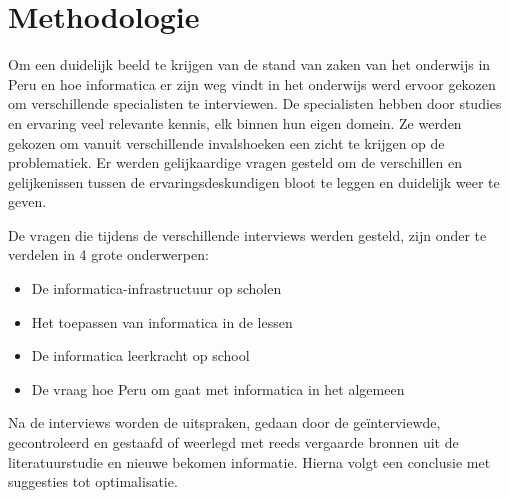 
\chapter{Methodologie}
\label{ch:methodologie}


Om een duidelijk beeld te krijgen van de stand van zaken van het onderwijs in Peru en hoe informatica er zijn weg vindt in het onderwijs werd ervoor gekozen om verschillende specialisten te interviewen. De specialisten hebben door studies en ervaring veel relevante kennis, elk binnen hun eigen domein. Ze werden gekozen om vanuit verschillende invalshoeken een zicht te krijgen op de problematiek. Er werden gelijkaardige vragen gesteld om de verschillen en gelijkenissen tussen de ervaringsdeskundigen bloot te leggen en duidelijk weer te geven.

De vragen die tijdens de verschillende interviews werden gesteld, zijn onder te verdelen in 4 grote onderwerpen: 

\begin{itemize}
	\item De informatica-infrastructuur op scholen
	\item Het toepassen van informatica in de lessen
	\item De informatica leerkracht op school
	\item De vraag hoe Peru om gaat met informatica in het algemeen
\end{itemize}

Na de interviews worden de uitspraken, gedaan door de geïnterviewde, gecontroleerd en gestaafd of weerlegd met reeds vergaarde bronnen uit de literatuurstudie en nieuwe bekomen informatie. Hierna volgt een conclusie met suggesties tot optimalisatie.

